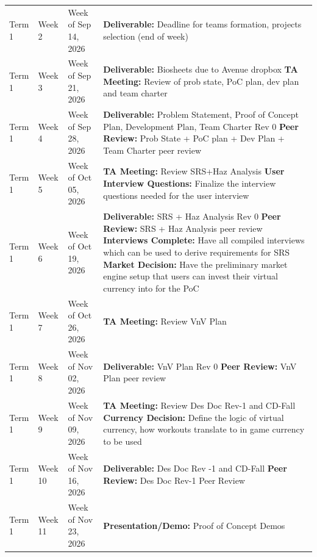 \documentclass{article}
\begin{document}
\begin{xltabular}{\textwidth}{lll>{\raggedright\arraybackslash}X}
Term 1 & Week 2  & Week of Sep 14, 2026 & \textbf{Deliverable:} Deadline for teams formation, projects selection (end of week)\\
\addlinespace
Term 1 & Week 3  & Week of Sep 21, 2026 & \textbf{Deliverable:} Biosheets due to Avenue dropbox \newline \textbf{TA Meeting:} Review of prob state, PoC plan, dev plan and team charter\\
\addlinespace
Term 1 & Week 4  & Week of Sep 28, 2026 & \textbf{Deliverable:} Problem Statement, Proof of Concept Plan, Development Plan, Team Charter Rev 0 \newline \textbf{Peer Review:} Prob State + PoC plan + Dev Plan + Team Charter peer review\\
\addlinespace
Term 1 & Week 5  & Week of Oct 05, 2026 & \textbf{TA Meeting:} Review SRS+Haz Analysis \newline \textbf{User Interview Questions:} Finalize the interview questions needed for the user interview\\
\addlinespace
Term 1 & Week 6  & Week of Oct 19, 2026 & \textbf{Deliverable:} SRS + Haz Analysis Rev 0 \newline \textbf{Peer Review:} SRS + Haz Analysis peer review \newline \textbf{Interviews Complete:} Have all compiled interviews which can be used to derive requirements for SRS \newline \textbf{Market Decision:} Have the preliminary market engine setup that users can invest their virtual currency into for the PoC\\
\addlinespace
Term 1 & Week 7  & Week of Oct 26, 2026 & \textbf{TA Meeting:} Review VnV Plan\\
\addlinespace
Term 1 & Week 8  & Week of Nov 02, 2026 & \textbf{Deliverable:} VnV Plan Rev 0 \newline \textbf{Peer Review:} VnV Plan peer review\\
\addlinespace
Term 1 & Week 9  & Week of Nov 09, 2026 & \textbf{TA Meeting:} Review Des Doc Rev-1 and CD-Fall \newline \textbf{Currency Decision:} Define the logic of virtual currency, how workouts translate to in game currency to be used\\
\addlinespace
Term 1 & Week 10 & Week of Nov 16, 2026 & \textbf{Deliverable:} Des Doc Rev -1 and CD-Fall \newline \textbf{Peer Review:} Des Doc Rev-1 Peer Review\\
\addlinespace
Term 1 & Week 11 & Week of Nov 23, 2026 & \textbf{Presentation/Demo:} Proof of Concept Demos\\

\end{xltabular}
\end{document}
